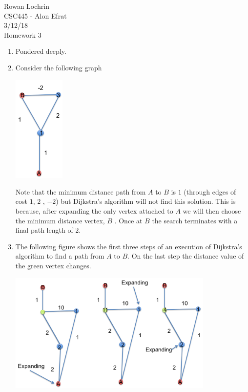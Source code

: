 \documentclass[11pt]{article}
\begin{document}
\begin{flushleft}
	Rowan Lochrin \\
	CSC445 - Alon Efrat\\
	3/12/18 \\
	Homework 3
\end{flushleft}
\begin{enumerate}
		\item Pondered deeply.

		\item 
		Consider the following graph
		\begin{center}
			\includegraphics[width=0.20\textwidth]{images/fig1}
		\end{center}
		Note that the minimum distance path from $A$ to $B$ is $1$
		(through edges of cost $1$, $2$ , $-2$) but
		Dijkstra's algorithm will not find this solution. This is because, after
		expanding the only vertex attached to $A$ we will then choose the
		minimum distance vertex, $B$ . Once at
		$B$ the search terminates with a final path length of $2$.
		\item 
		The following figure shows the first three steps of an execution of Dijkstra's
		algorithm to find a path from $A$ to $B$. On the last step the
		distance value of the green vertex changes.
		\begin{center}
		\includegraphics[width=0.80\textwidth]{images/fig2}
		\end{center}

\end{enumerate}
\end{document}
